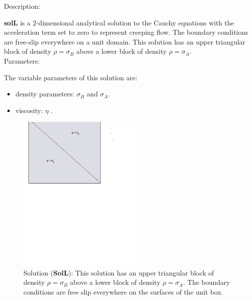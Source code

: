   {\large \fontB Description:}
  
  {\bf solL} is a 2-dimensional analytical solution to the Cauchy equations with the acceleration term set to zero
  to represent creeping flow. The boundary conditions are free-slip everywhere on a unit domain. 
  This solution has an upper triangular block of density $\rho = \sigma_B$ above
      a lower block of density $\rho = \sigma_A$.
  \\

  {\large \fontB Parameters:}
 
  The variable parameters of this solution are:
  \begin{itemize}
    \item{density parameters: $ \sigma_B $ and $ \sigma_A $.}
    \item{viscosity: $\eta$ .}
    \end{itemize}

  \begin{figure}
    \includegraphics[width=6cm,clip]{../figs/figL.pdf}
    \caption[Short caption]{\label{figL} 
      Solution ({\bf SolL}):
      This solution has an upper triangular block of density $\rho = \sigma_B$ above
      a lower block of density $\rho = \sigma_A$.
      The boundary conditions are free slip everywhere on the surfaces of the unit box.}
  \end{figure} 
  

